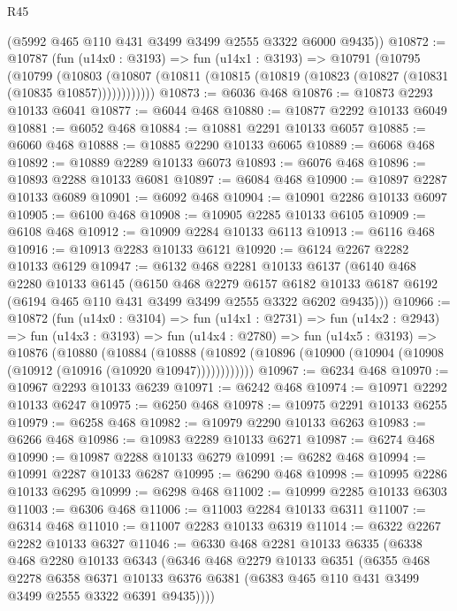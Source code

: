\begin{lexlean}{R45}
\begin{coremodule}
      (@5992 @465 @110 @431 @3499 @3499 @2555 @3322 @6000 @9435))
@10872 := @10787
    (fun (u14x0 : @3193) =>
    fun (u14x1 : @3193) =>
    @10791
      (@10795
        (@10799
          (@10803 (@10807 (@10811 (@10815 (@10819 (@10823 (@10827 (@10831 (@10835 @10857))))))))))))
@10873 := @6036 @468
@10876 := @10873 @2293 @10133 @6041
@10877 := @6044 @468
@10880 := @10877 @2292 @10133 @6049
@10881 := @6052 @468
@10884 := @10881 @2291 @10133 @6057
@10885 := @6060 @468
@10888 := @10885 @2290 @10133 @6065
@10889 := @6068 @468
@10892 := @10889 @2289 @10133 @6073
@10893 := @6076 @468
@10896 := @10893 @2288 @10133 @6081
@10897 := @6084 @468
@10900 := @10897 @2287 @10133 @6089
@10901 := @6092 @468
@10904 := @10901 @2286 @10133 @6097
@10905 := @6100 @468
@10908 := @10905 @2285 @10133 @6105
@10909 := @6108 @468
@10912 := @10909 @2284 @10133 @6113
@10913 := @6116 @468
@10916 := @10913 @2283 @10133 @6121
@10920 := @6124 @2267 @2282 @10133 @6129
@10947 := @6132
    @468
    @2281
    @10133
    @6137
    (@6140
      @468
      @2280
      @10133
      @6145
      (@6150
        @468
        @2279
        @6157
        @6182
        @10133
        @6187
        @6192
        (@6194 @465 @110 @431 @3499 @3499 @2555 @3322 @6202 @9435)))
@10966 := @10872
    (fun (u14x0 : @3104) =>
    fun (u14x1 : @2731) =>
    fun (u14x2 : @2943) =>
    fun (u14x3 : @3193) =>
    fun (u14x4 : @2780) =>
    fun (u14x5 : @3193) =>
    @10876
      (@10880
        (@10884
          (@10888 (@10892 (@10896 (@10900 (@10904 (@10908 (@10912 (@10916 (@10920 @10947))))))))))))
@10967 := @6234 @468
@10970 := @10967 @2293 @10133 @6239
@10971 := @6242 @468
@10974 := @10971 @2292 @10133 @6247
@10975 := @6250 @468
@10978 := @10975 @2291 @10133 @6255
@10979 := @6258 @468
@10982 := @10979 @2290 @10133 @6263
@10983 := @6266 @468
@10986 := @10983 @2289 @10133 @6271
@10987 := @6274 @468
@10990 := @10987 @2288 @10133 @6279
@10991 := @6282 @468
@10994 := @10991 @2287 @10133 @6287
@10995 := @6290 @468
@10998 := @10995 @2286 @10133 @6295
@10999 := @6298 @468
@11002 := @10999 @2285 @10133 @6303
@11003 := @6306 @468
@11006 := @11003 @2284 @10133 @6311
@11007 := @6314 @468
@11010 := @11007 @2283 @10133 @6319
@11014 := @6322 @2267 @2282 @10133 @6327
@11046 := @6330
    @468
    @2281
    @10133
    @6335
    (@6338
      @468
      @2280
      @10133
      @6343
      (@6346
        @468
        @2279
        @10133
        @6351
        (@6355
          @468
          @2278
          @6358
          @6371
          @10133
          @6376
          @6381
          (@6383 @465 @110 @431 @3499 @3499 @2555 @3322 @6391 @9435))))

\end{coremodule}
\end{lexlean}

